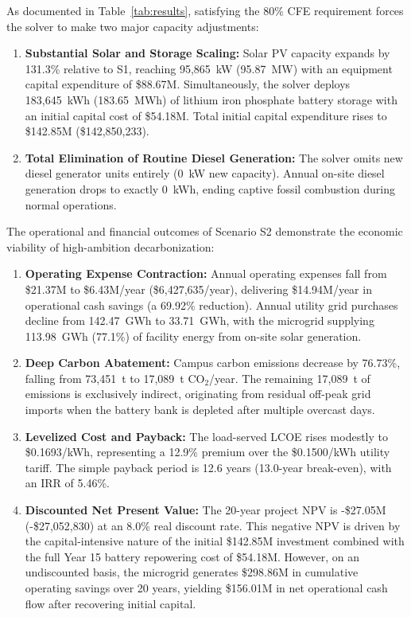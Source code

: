 \documentclass[11pt,a4paper]{article}
\begin{document}
As documented in Table~\ref{tab:results}, satisfying the 80\% CFE requirement forces the solver to make two major capacity adjustments:
\begin{enumerate}
    \item \textbf{Substantial Solar and Storage Scaling:} Solar PV capacity expands by 131.3\% relative to S1, reaching 95,865~kW (95.87~MW) with an equipment capital expenditure of \$88.67M. Simultaneously, the solver deploys 183,645~kWh (183.65~MWh) of lithium iron phosphate battery storage with an initial capital cost of \$54.18M. Total initial capital expenditure rises to \$142.85M (\$142,850,233).
    \item \textbf{Total Elimination of Routine Diesel Generation:} The solver omits new diesel generator units entirely (0~kW new capacity). Annual on-site diesel generation drops to exactly 0~kWh, ending captive fossil combustion during normal operations.
\end{enumerate}

The operational and financial outcomes of Scenario S2 demonstrate the economic viability of high-ambition decarbonization:
\begin{enumerate}
    \item \textbf{Operating Expense Contraction:} Annual operating expenses fall from \$21.37M to \$6.43M/year (\$6,427,635/year), delivering \$14.94M/year in operational cash savings (a 69.92\% reduction). Annual utility grid purchases decline from 142.47~GWh to 33.71~GWh, with the microgrid supplying 113.98~GWh (77.1\%) of facility energy from on-site solar generation.
    \item \textbf{Deep Carbon Abatement:} Campus carbon emissions decrease by 76.73\%, falling from 73,451~t to 17,089~t CO$_2$/year. The remaining 17,089~t of emissions is exclusively indirect, originating from residual off-peak grid imports when the battery bank is depleted after multiple overcast days.
    \item \textbf{Levelized Cost and Payback:} The load-served LCOE rises modestly to \$0.1693/kWh, representing a 12.9\% premium over the \$0.1500/kWh utility tariff. The simple payback period is 12.6 years (13.0-year break-even), with an IRR of 5.46\%. 
    \item \textbf{Discounted Net Present Value:} The 20-year project NPV is -\$27.05M (-\$27,052,830) at an 8.0\% real discount rate. This negative NPV is driven by the capital-intensive nature of the initial \$142.85M investment combined with the full Year 15 battery repowering cost of \$54.18M. However, on an undiscounted basis, the microgrid generates \$298.86M in cumulative operating savings over 20 years, yielding \$156.01M in net operational cash flow after recovering initial capital.
\end{enumerate}
\end{document}
